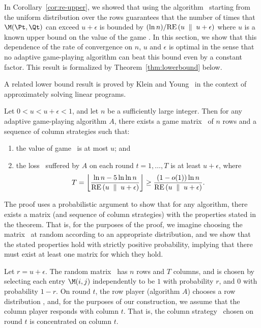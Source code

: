 In Corollary~\ref{cor:re-upper}, we showed that using the algorithm
\lwalgvar\ starting from the uniform distribution over the rows
guarantees that the number of times that $\M(\Pt, \Qt)$ can exceed
$u+\epsilon$ is bounded by $(\ln n) / {\rm RE}\left( {u} \; \parallel \; {u+\epsilon} \right)$ where $u$ is
a known upper bound on the value of the game \M.
In this section,
we show that this dependence of the rate of convergence on $n$, $u$ and
$\epsilon$ is optimal in the sense that
no adaptive game-playing
algorithm can beat this bound even by a constant factor.
This result is formalized by Theorem~\ref{thm:lowerbound} below.

A related lower bound result is proved by Klein and
Young~\cite{KleinYo99} in the context of approximately solving linear
programs.

\begin{theorem} \label{thm:lowerbound}
Let $0 < u < u+\epsilon < 1$, and let $n$ be a sufficiently large
integer.
Then for any adaptive game-playing algorithm $A$,
there exists a game matrix \M\
of $n$ rows and a sequence of column strategies such that:
\begin{enumerate}
\item \label{item-val}
the value of game \M\ is at most $u$; and
\item \label{item-loss}
the loss \mptqt\ suffered by $A$ on each round $t=1,\ldots, T$ is at
least $u+\epsilon$, where
\[ T = {\left\lfloor{\frac{\ln n - 5 \ln \ln n}{{\rm RE}\left( {u} \; \parallel \; {u+\epsilon} \right) }}\right\rfloor}
     \geq \frac{(1-o(1))\ln n}{{\rm RE}\left( {u} \; \parallel \; {u+\epsilon} \right)}. \]
\end{enumerate}
\end{theorem}

\proof
The proof uses a probabilistic argument to show that
for any algorithm, there exists a matrix (and sequence of column
strategies) with the properties stated in the theorem.
That is, for the purposes of the proof, we imagine choosing the matrix
\M\ at random according to an appropriate distribution, and we show
that the stated properties hold with strictly positive probability,
implying that there must exist at least one matrix for which they hold.

Let $r = u +\epsilon$.
The random matrix \M\ has $n$ rows and $T$ columns, and is chosen by
selecting each entry $\M(i,j)$ independently to be $1$ with
probability $r$, and $0$
with probability $1-r$.
On round $t$, the row player (algorithm $A$) chooses a row
distribution \Pt, and, for the purposes of our construction, we assume
that the
column player responds with column $t$.
That is, the column strategy \Qt\ chosen on round $t$ is concentrated
on column $t$.

